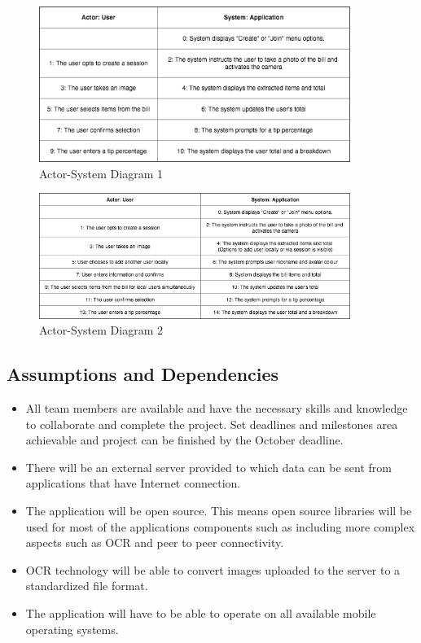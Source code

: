 \documentclass[12pt,a4paper]{article}
\begin{document}
\begin{figure}[H]

    \vspace{1cm}

    \includegraphics[width=0.9\textwidth]{diagrams/ASIM.png}
   \vspace{0.1cm}
    \caption{Actor-System Diagram 1}
    \label{Actor-System Diagram 1}
\end{figure}
    \vspace{1cm}
\begin{figure}[H]
  \includegraphics[width=0.9\textwidth]{diagrams/ASIM2.png}
   \vspace{0.1cm}
    \caption{Actor-System Diagram 2}
    \label{Actor-System Diagram 2}


\end{figure}

   	\subsection{Assumptions and Dependencies}
		 \begin{itemize}
	\item All team members are available and have the necessary skills and knowledge to collaborate and complete the project.
Set deadlines and milestones area achievable and project can be finished by the October deadline.
\item There will be an external server provided to which data can be sent from applications that have Internet connection.
\item The application will be open source. This means open source libraries will be used for most of the applications components such as including more complex aspects such as OCR and peer to peer connectivity.
\item OCR technology will be able to convert images uploaded to the server to a standardized file format.
\item The application will have to be able to operate on all available mobile operating systems.
\end{itemize}
\end{document}
